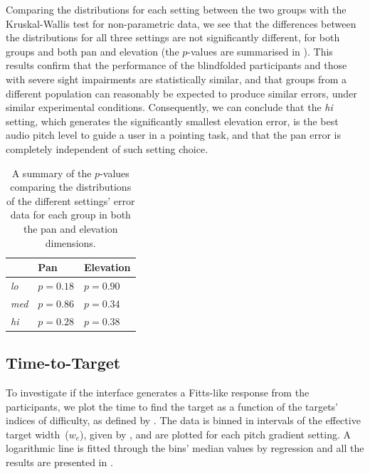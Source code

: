 \documentclass[acmsmall]{acmart}
\begin{document}
Comparing the distributions for each setting between the two groups with the Kruskal-Wallis test for non-parametric data, we see that the differences between the distributions for all three settings are not significantly different, for both groups and both pan and elevation (the $p$-values are summarised in ).
This results confirm that the performance of the blindfolded participants and those with severe sight impairments are statistically similar, and that groups from a different population can reasonably be expected to produce similar errors, under similar experimental conditions. 
Consequently, we can conclude that the \textit{hi} setting, which generates the significantly smallest elevation error, is the best audio pitch level to guide a user in a pointing task, and that the pan error is completely independent of such setting choice. 

\begin{table}
  \centering
  \caption{A summary of the $p$-values comparing the distributions of the different settings' error data for each group in both the pan and elevation dimensions. }\label{tab:inter-group-results}
  \begin{tabular}{lll}
    \toprule
                   & Pan      & Elevation \\ \midrule
      \textit{lo}  & $p=0.18$ & $p=0.90$  \\
      \textit{med} & $p=0.86$ & $p=0.34$  \\
      \textit{hi}  & $p=0.28$ & $p=0.38$  \\
    \bottomrule
  \end{tabular}
\end{table}

\subsection{Time-to-Target}

To investigate if the interface generates a Fitts-like response from the participants, we plot the time to find the target as a function of the targets' indices of difficulty, as defined by .
The data is binned in intervals of the effective target width~($w_e$), given by , and are plotted for each pitch gradient setting. 
A logarithmic line is fitted through the bins' median values by regression and all the results are presented in .
\end{document}
